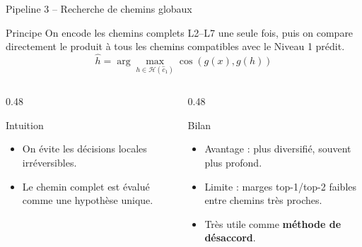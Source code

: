 \documentclass[11pt,aspectratio=169]{beamer}
\begin{document}
\begin{frame}{Pipeline 3 -- Recherche de chemins globaux}
\small
\begin{block}{Principe}
On encode les chemins complets L2--L7 une seule fois, puis on compare directement le produit à tous les chemins compatibles avec le Niveau 1 prédit.
\[
\hat{h}=\arg\max_{h\in\mathcal{H}(\hat{c}_1)}\cos(g(x),g(h))
\]
\end{block}

\begin{columns}
\begin{column}{0.48\textwidth}
\begin{block}{Intuition}
\begin{itemize}
    \item On évite les décisions locales irréversibles.
    \item Le chemin complet est évalué comme une hypothèse unique.
\end{itemize}
\end{block}
\end{column}

\begin{column}{0.48\textwidth}
\begin{block}{Bilan}
\begin{itemize}
    \item Avantage : plus diversifié, souvent plus profond.
    \item Limite : marges top-1/top-2 faibles entre chemins très proches.
    \item Très utile comme \textbf{méthode de désaccord}.
\end{itemize}
\end{block}
\end{column}
\end{columns}
\end{frame}
\end{document}
